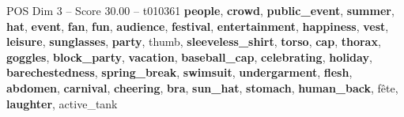 \begin{textsample}{POS Dim 3 – Score 30.00 – t010361}  \label{ex:f3_pos_005}
\textbf{people}, \textbf{crowd}, \textbf{public\_event}, \textbf{summer}, \textbf{hat}, \textbf{event}, \textbf{fan}, \textbf{fun}, \textbf{audience}, \textbf{festival}, \textbf{entertainment}, \textbf{happiness}, \textbf{vest}, \textbf{leisure}, \textbf{sunglasses}, \textbf{party}, thumb, \textbf{sleeveless\_shirt}, \textbf{torso}, \textbf{cap}, \textbf{thorax}, \textbf{goggles}, \textbf{block\_party}, \textbf{vacation}, \textbf{baseball\_cap}, \textbf{celebrating}, \textbf{holiday}, \textbf{barechestedness}, \textbf{spring\_break}, \textbf{swimsuit}, \textbf{undergarment}, \textbf{flesh}, \textbf{abdomen}, \textbf{carnival}, \textbf{cheering}, \textbf{bra}, \textbf{sun\_hat}, \textbf{stomach}, \textbf{human\_back}, fête, \textbf{laughter}, active\_tank

\end{textsample}
